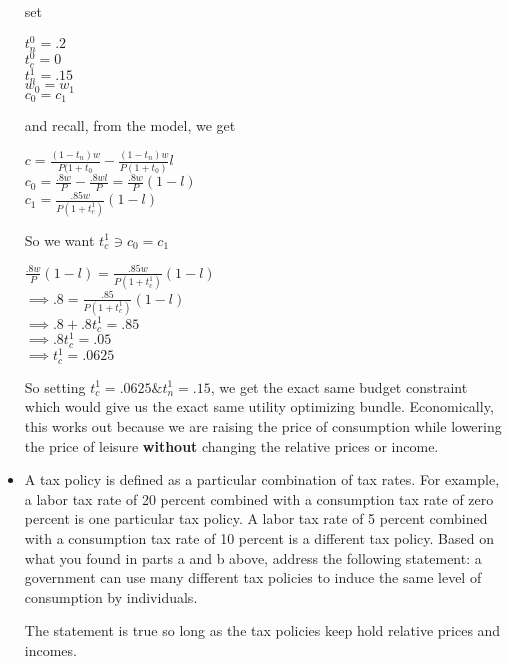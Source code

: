 \documentclass[11pt]{SelfArxOneColBMN}
\begin{document}
\begin{exercise}
\begin{itemize}
        \begin{solution}
                set
		\begin{center}
			$t_n^0 = .2$\\
			$t_c^0 = 0$\\
			$t_n^1 = .15$\\
			$w_0 = w_1$\\
			$c_0 = c_1$\\
		\end{center}
		and recall, from the model, we get
		\begin{center}
			$c = \frac{(1 - t_n)w}{P(1 + t_0} - \frac{(1 - t_n)w}{P(1 + t_0)}l$\\
			$c_0 = \frac{.8w}{P} - \frac{.8wl}{P} = \frac{.8w}{P}(1 - l)$\\
			$c_1 = \frac{.85w}{P(1 + t_c^1)}(1 - l)$
		\end{center}
		So we want $t_c^1 \ni c_0 = c_1$
		\begin{center}
			$\frac{.8w}{P}(1 - l) = \frac{.85w}{P(1 + t_c^1)}(1 - l)$\\
			$\implies .8 = \frac{.85}{P(1 + t_c^1)}(1 - l)$\\
			$\implies .8 + .8t_c^1 = .85$\\
			$\implies .8t_c^1 = .05$\\
			$\implies t_c^1 = .0625$
		\end{center}
		So setting $t_c^1 = .0625 \& t_n^1 = .15$, we get the exact same budget constraint which would give us the exact same utility optimizing bundle. Economically, this works out because we are raising the price of consumption while lowering the price of leisure \textbf{without} changing the relative prices or income.
        \end{solution}


\item A tax policy is defined as a particular combination of tax rates. For example, a labor tax rate of 20 percent combined with a consumption tax rate of zero percent is one particular tax policy. A labor tax rate of 5 percent combined with a consumption tax rate of 10 percent is a different tax policy. Based on what you found in parts a and b above, address the following statement: a government can use many different tax policies to induce the same level of consumption by individuals.

        \begin{solution}
                The statement is true so long as the tax policies keep hold relative prices and incomes. 
        \end{solution}



\end{itemize}
\end{exercise}
\end{document}
